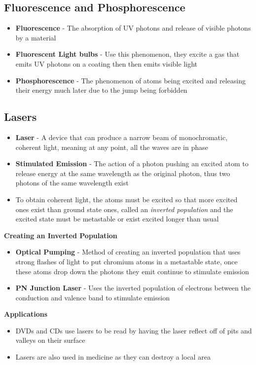 \subsection{Fluorescence and Phosphorescence}
\begin{itemize}
    \item \textbf{Fluorescence} - The absorption of UV photons and release of visible photons by a material
    \item \textbf{Fluorescent Light bulbs} - Use this phenomenon, they excite a gas that emits UV photons on a coating then then emits visible light
    \item \textbf{Phosphorescence} - The phenomenon of atoms being excited and releasing their energy much later due to the jump being forbidden
\end{itemize}

\subsection{Lasers}
\begin{itemize}
    \item \textbf{Laser} - A device that can produce a narrow beam of monochromatic, coherent light, meaning at any point, all the waves are in phase
    \item \textbf{Stimulated Emission} - The action of a photon pushing an excited atom to release energy at the same wavelength as the original photon, thus two photons of the same wavelength exist
    \item To obtain coherent light, the atoms must be excited so that more excited ones exist than ground state ones, called an \emph{inverted population} and the excited state must be metastable or exist excited longer than usual
\end{itemize}

\textbf{Creating an Inverted Population}
\begin{itemize}
    \item \textbf{Optical Pumping} - Method of creating an inverted population that uses strong flashes of light to put chromium atoms in a metastable state, once these atoms drop down the photons they emit continue to stimulate emission
    \item \textbf{PN Junction Laser} - Uses the inverted population of electrons between the conduction and valence band to stimulate emission
\end{itemize}

\textbf{Applications}
\begin{itemize}
    \item DVDs and CDs use lasers to be read by having the laser reflect off of pits and valleys on their surface
    \item Lasers are also used in medicine as they can destroy a local area
\end{itemize}

